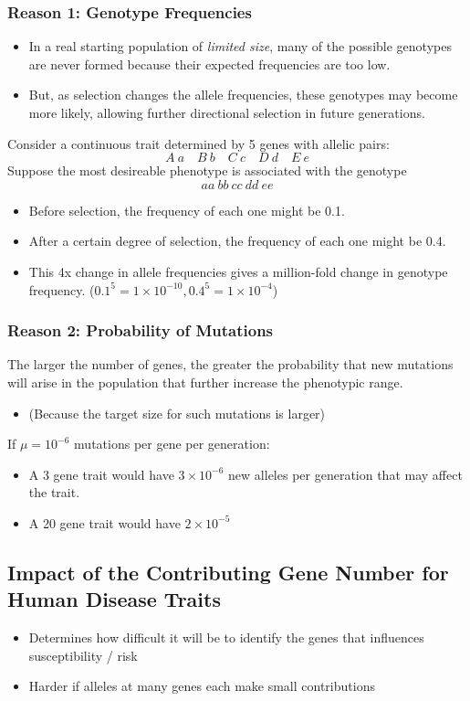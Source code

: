 \documentclass[10pt]{article}
\begin{document}
\subsubsection*{Reason 1: Genotype Frequencies}
\begin{itemize}
	\item In a real starting population of \textit{limited size}, many of the possible genotypes are never formed because their expected frequencies are too low.
	\item But, as selection changes the allele frequencies, these genotypes may become more likely, allowing further directional selection in future generations.
\end{itemize}
Consider a continuous trait determined by 5 genes with allelic pairs:
\[A~a \quad B~b \quad C~c \quad D~d \quad E~e\]
Suppose the most desireable phenotype is associated with the genotype
\[aa~bb~cc~dd~ee\]
\begin{itemize}
	\item Before selection, the frequency of each one might be 0.1.
	\item After a certain degree of selection, the frequency of each one might be 0.4.
	\item This 4x change in allele frequencies gives a million-fold change in genotype frequency.  ($0.1^5 = 1\times 10^{-10}, 0.4^5 = 1\times 10^{-4}$)
\end{itemize}

\subsubsection*{Reason 2: Probability of Mutations}
The larger the number of genes, the greater the probability that new mutations will arise in the population that further increase the phenotypic range.
\begin{itemize}
	\item (Because the target size for such mutations is larger)
\end{itemize}
If $\mu = 10^{-6}$ mutations per gene per generation:
\begin{itemize}
	\item A 3 gene trait would have $3 \times 10^{-6}$ new alleles per generation that may affect the trait.
	\item A 20 gene trait would have $2 \times 10^{-5}$
\end{itemize}

\subsection*{Impact of the Contributing Gene Number for Human Disease Traits}
\begin{itemize}
	\item Determines how difficult it will be to identify the genes that influences susceptibility / risk
	\item Harder if alleles at many genes each make small contributions
\end{itemize}
\end{document}
